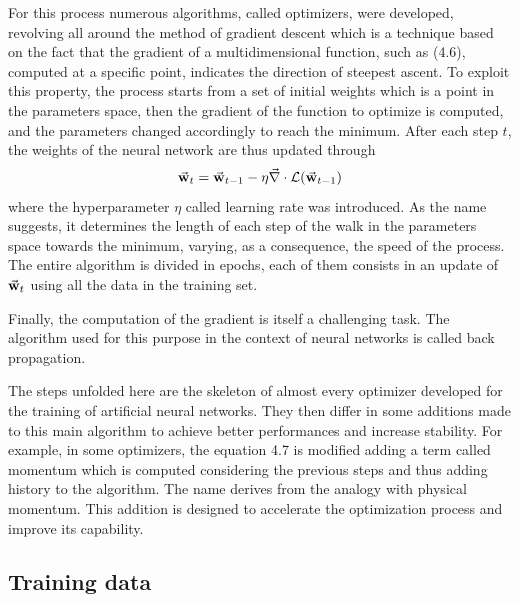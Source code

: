\documentclass[a4paper,10pt]{report}
\begin{document}
For this process numerous algorithms, called optimizers, were developed, 
revolving all around the method of gradient descent
which is a technique based on the fact that the gradient of a multidimensional function, such as (4.6), computed
at a specific point, indicates the direction of steepest ascent.
To exploit this property, the process starts from a set of initial weights which is a point in the parameters space, 
then the gradient of the function to optimize is computed, and the parameters changed accordingly to reach the minimum.
After each step $t$, the weights of the neural network are thus updated through
\begin{equation}
    \va w_t = \va w_{t-1} - \eta \va \nabla \cdot \mathcal{L}(\va w_{t-1})
\end{equation}
where the hyperparameter $\eta$ called learning rate was introduced. As the name suggests, it determines 
the length of each step of the walk in the parameters space towards the minimum, varying, as a consequence,
the speed of the process. The entire algorithm is divided in epochs, each of them consists in an update of $\va w_t$
using all the data in the training set.

Finally, the computation of the gradient is itself a challenging task. The algorithm used for this purpose in the context 
of neural networks is called back propagation.

The steps unfolded here are the skeleton of almost every optimizer developed for the training of artificial neural 
networks. They then differ in some additions
made to this main algorithm to achieve better performances and increase stability.
For example, in some optimizers, the equation 4.7 is modified adding a term called momentum which is computed 
considering the previous steps and thus adding history to the algorithm. The name derives from the analogy with physical momentum.
This addition is designed to accelerate the optimization process and improve its capability.

\subsection{Training data}

\end{document}
